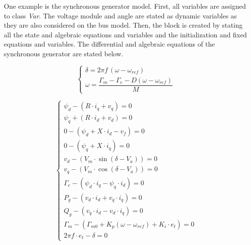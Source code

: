 One example is the synchronous generator model. First, all variables are assigned to class \textit{Var}. The voltage module and angle are stated as dynamic variables as they are also 
considered on the bus model. Then, the block is created by stating all the state and algebraic equations and variables and the initialization and fixed equations and variables. The differential
and algebraic equations of the synchronous generator are stated below.

\begin{equation}
\begin{cases}
\delta = 2\pi f\,(\omega - \omega_{ref}) \\
\omega = \dfrac{\Gamma_m - \Gamma_e - D(\omega - \omega_{ref})}{M}
\end{cases}
\label{eq:diff_eq_gen}
\end{equation}

\begin{equation}
\begin{cases}
\psi_d - (R \cdot i_q + v_q) = 0 \\
\psi_q + (R\cdot i_d + v_d) = 0\\
0 - ( \psi_d + X \cdot i_d - v_f ) = 0\\
0 - (\psi_q + X \cdot i_q) = 0 \\
v_d - (V_m \cdot \sin(\delta - V_a)) = 0\\
v_q - (V_m \cdot \cos(\delta - V_a)) = 0\\
\Gamma_e - ( \psi_d \cdot i_q - \psi_q \cdot i_d ) = 0\\
P_g - (v_d \cdot i_d + v_q \cdot i_q) = 0\\
Q_g - (v_q \cdot i_d - v_d \cdot i_q) = 0 \\
\Gamma_m - (\Gamma_{m0} + K_p(\omega - \omega_{ref}) + K_i \cdot e_t) = 0\\
2\pi f \cdot e_t - \delta = 0
\end{cases}
\label{eq:alg_eq_gen}
\end{equation}


